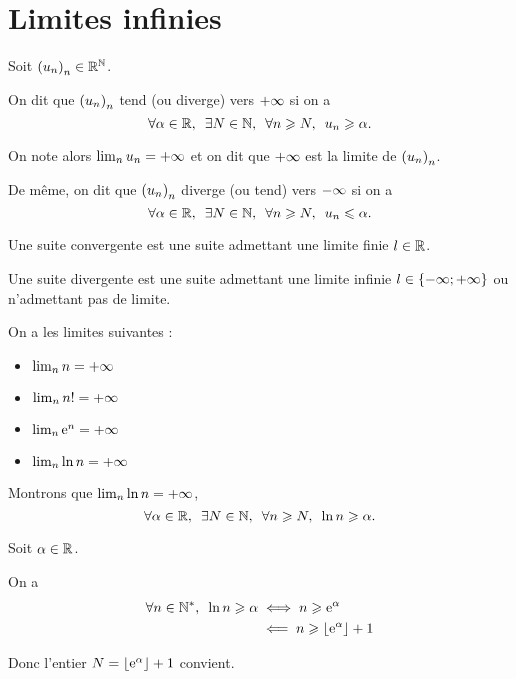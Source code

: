 \section{Limites infinies}

\begin{defi}
Soit \(\left(u_n\right)_n\in\mathbb{R}^{\mathbb{N}}\).

On dit que \(\left(u_n\right)_n\) tend (ou diverge) vers \(+\infty\) si on a \[\quantifs{\forall\alpha\in\R;\exists N\in\N;\forall n\geq N}u_n\geq\alpha.\]

On note alors \(\lim_nu_n=+\infty\) et on dit que \(+\infty\) est la limite de \(\left(u_n\right)_n\).

De même, on dit que \(\left(u_n\right)_n\) diverge (ou tend) vers \(-\infty\) si on a \[\quantifs{\forall\alpha\in\R;\exists N\in\N;\forall n\geq N}u_n\leq\alpha.\]
\end{defi}

\begin{rem}
Une suite convergente est une suite admettant une limite finie \(l\in\mathbb{R}\).

Une suite divergente est une suite admettant une limite infinie \(l\in\left\lbrace-\infty;+\infty\right\rbrace\) ou n'admettant pas de limite.
\end{rem}

\begin{ex}
On a les limites suivantes :

\begin{itemize}
\item \(\lim_nn=+\infty\) \\

\item \(\lim_nn!=+\infty\) \\

\item \(\lim_n\mathrm{e}^{n}=+\infty\) \\

\item \(\lim_n\ln n=+\infty\) \\
\end{itemize}
\end{ex}

\begin{dem}
Montrons que \(\lim_n\ln n=+\infty\), \cad \[\quantifs{\forall\alpha\in\R;\exists N\in\N;\forall n\geq N}\ln n\geq\alpha.\]

Soit \(\alpha\in\mathbb{R}\).

On a \[\begin{aligned}
\quantifs{\forall n\in\Ns}\ln n\geq\alpha&\ssi n\geq\e{\alpha} \\
&\impr n\geq\floor{\e{\alpha}}+1
\end{aligned}\]

Donc l'entier \(N=\left\lfloor\mathrm{e}^{\alpha}\right\rfloor+1\) convient.
\end{dem}

